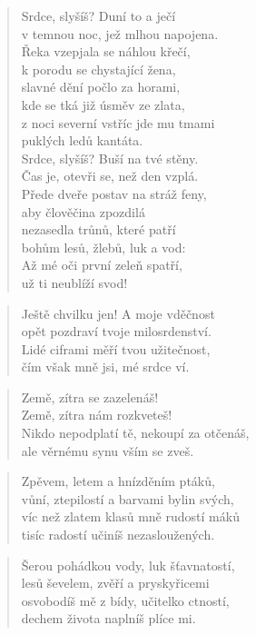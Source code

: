 \documentclass{book}
\begin{document}
\newpage
{}
\begin{verse}
Srdce, slyšíš? Duní to a ječí\\
v temnou noc, jež mlhou napojena.\\
Řeka vzepjala se náhlou křečí,\\
k porodu se chystající žena,\\
slavné dění počlo za horami,\\
kde se tká již úsměv ze zlata,\\
z noci severní vstříc jde mu tmami\\
puklých ledů kantáta.\\
Srdce, slyšíš? Buší na tvé stěny.\\
Čas je, otevři se, než den vzplá.\\
Přede dveře postav na stráž feny,\\
aby člověčina zpozdilá\\
nezasedla trůnů, které patří\\
bohům lesů, žlebů, luk a vod:\\
Až mé oči první zeleň spatří,\\
už ti neublíží svod!
\end{verse}
\newpage
{}
\begin{verse}
Ještě chvilku jen! A moje vděčnost\\
opět pozdraví tvoje milosrdenství.\\
Lidé ciframi měří tvou užitečnost,\\
čím však mně jsi, mé srdce ví.
\end{verse}
\begin{verse}
Země, zítra se zazelenáš!\\
Země, zítra nám rozkveteš!\\
Nikdo nepodplatí tě, nekoupí za otčenáš,\\
ale věrnému synu vším se zveš.
\end{verse}
\begin{verse}
Zpěvem, letem a hnízděním ptáků,\\
vůní, ztepilostí a barvami bylin svých,\\
víc než zlatem klasů mně rudostí máků\\
tisíc radostí učiníš nezasloužených.
\end{verse}
\begin{verse}
Šerou pohádkou vody, luk šťavnatostí,\\
lesů ševelem, zvěří a pryskyřicemi\\
osvobodíš mě z bídy, učitelko ctností,\\
dechem života naplníš plíce mi.
\end{verse}
\end{document}
